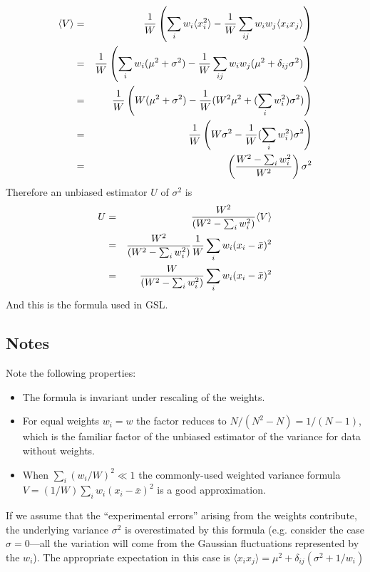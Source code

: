 \documentclass[fleqn,12pt]{article}
\newcommand{\expectation}[1]{\langle #1 \rangle}
\begin{document}
%
\begin{eqnarray}
\expectation{V}   &=& {1\over W} \left( \sum_i w_i \expectation{x_i^2}
       - {1 \over W} \sum_{ij} w_i w_j \expectation{x_i x_j}\right)\\
      &=& {1\over W} \left( \sum_i w_i (\mu^2 + \sigma^2)
       - {1 \over W} \sum_{ij} w_i w_j (\mu^2 + \delta_{ij} \sigma^2)\right)\\
      &=& {1\over W} \left( W (\mu^2 + \sigma^2)
       - {1 \over W} ( W^2 \mu^2 +( \sum_i w_i^2) \sigma^2)\right)\\
      &=& {1\over W} \left(W \sigma^2 - {1 \over W} ( \sum_i w_i^2)\sigma^2\right)\\
      &=& \left({{W^2 - \sum_i w_i^2} \over W^2}\right) \sigma^2
\end{eqnarray}
%
Therefore an unbiased estimator $U$ of $\sigma^2$ is
%
\begin{eqnarray}
U &=& {W^2 \over {(W^2 - \sum_i w_i^2)}} \expectation{V}\\
  &=& {W^2 \over {(W^2 - \sum_i w_i^2)}} {1\over W} \sum_i w_i (x_i - \bar{x})^2 \\
  &=& {W \over {(W^2 - \sum_i w_i^2)}} \sum_i w_i (x_i - \bar{x})^2
\end{eqnarray}
%
And this is the formula used in GSL.
\subsection{Notes}
Note the following properties:

\begin{itemize}
\item
The formula is invariant under rescaling of the weights.

\item 
For equal weights $w_i = w$ the factor reduces to $N/(N^2-N) =
1/(N-1)$, which is the familiar factor of the unbiased estimator of
the variance for data without weights.

\item
When $\sum_i (w_i/W)^2 \ll 1$ the commonly-used weighted variance
formula $V = (1/W)\sum_i w_i (x_i - \bar{x})^2$ is a good
approximation.
\end{itemize}

If we assume that the ``experimental errors'' arising from the weights
contribute, the underlying variance $\sigma^2$ is overestimated by
this formula (e.g. consider the case $\sigma = 0$---all the variation
will come from the Gaussian fluctuations represented by the
$w_i$). The appropriate expectation in this case is $\expectation{x_i
  x_j} = \mu^2 + \delta_{ij} (\sigma^2 + 1/w_i)$
\end{document}
